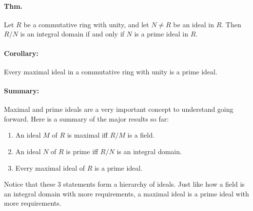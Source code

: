\documentclass[10pt,a4paper]{article}
\begin{document}
\paragraph{Thm.} Let $R$ be a commutative ring with unity, and let $N \neq R$ be an ideal in $R$. Then $R/N$ is an integral domain if and only if $N$ is a prime ideal in $R$.

\paragraph{Corollary:} Every maximal ideal in a commutative ring with unity is a prime ideal.

\paragraph{Summary:} Maximal and prime ideals are a very important concept to understand going forward. Here is a summary of the major results so far:
\begin{enumerate}
\item An ideal $M$ of $R$ is maximal iff $R/M$ is a field.
\item An ideal $N$ of $R$ is prime iff $R/N$ is an integral domain.
\item Every maximal ideal of $R$ is a prime ideal.
\end{enumerate}
Notice that these 3 statements form a hierarchy of ideals. Just like how a field is an integral domain with more requirements, a maximal ideal is a prime ideal with more requirements.
\end{document}
